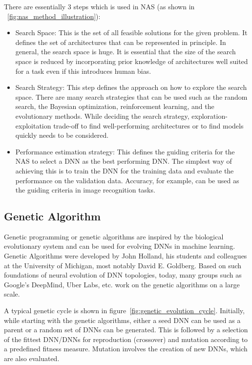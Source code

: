 There are essentially 3 steps which is used in NAS (as shown in ~\ref{fig:nas_method_illustration}):
\begin{itemize}
    \item Search Space: This is the set of all feasible solutions for the given problem. It defines the set of architectures that can be represented in principle. In general, the search space is huge. It is essential that the size of the search space is reduced by incorporating prior knowledge of architectures well suited for a task even if this introduces human bias.
    
    \item Search Strategy: This step defines the approach on how to explore the search space. There are many search strategies that can be used such as the random search, the Bayesian optimization, reinforcement learning, and the evolutionary methods. While deciding the search strategy, exploration-exploitation trade-off to find well-performing architectures or to find models quickly needs to be considered. 
    
    \item Performance estimation strategy: This defines the guiding criteria for the NAS to select a DNN as the best performing DNN. The simplest way of achieving this is to train the DNN for the training data and evaluate the performance on the validation data. Accuracy, for example, can be used as the guiding criteria in image recognition tasks. 
\end{itemize}

\subsection{Genetic Algorithm}
\label{sec:genetic_algorithm_background}

Genetic programming or genetic algorithms are inspired by the biological evolutionary system and can be used for evolving DNNs in machine learning. Genetic Algorithms were developed by John Holland, his students and colleagues at the University of Michigan, most notably David E. Goldberg. Based on such foundations of neural evolution of DNN topologies, today, many groups such as Google's DeepMind, Uber Labs, etc. work on the genetic algorithms on a large scale.

A typical genetic cycle is shown in figure~\ref{fig:genetic_evolution_cycle}. Initially, while starting with the genetic algorithms, either a seed DNN can be used as a parent or a random set of DNNs can be generated. This is followed by a selection of the fittest DNN/DNNs for reproduction (crossover) and mutation according to a predefined fitness measure. Mutation involves the creation of new DNNs, which are also evaluated. 

